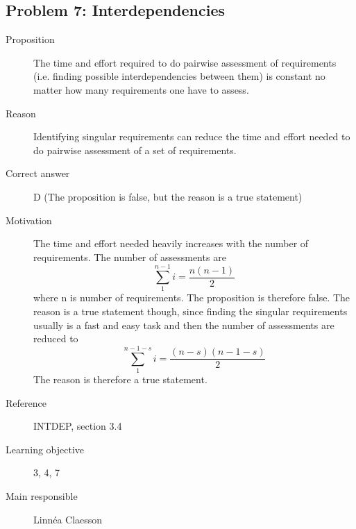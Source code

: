 \documentclass[10pt,a4paper]{article}
\begin{document}
\subsection*{Problem 7: Interdependencies}
\begin{description}
\item[Proposition] The time and effort required to do pairwise assessment of requirements (i.e. finding possible interdependencies between them) is constant no matter how many requirements one have to assess. 
\item[Reason] Identifying singular requirements can reduce the time and effort needed to do pairwise assessment of a set of requirements. 
\item[Correct answer] D (The proposition is false, but the reason is a true statement)
\item[Motivation] The time and effort needed heavily increases with the number of requirements. The number of assessments are 
\begin{equation}
\sum_{1}^{n-1}i = \frac{n(n-1)}{2} 
\end{equation}
where n is number of requirements. The proposition is therefore false. The reason is a true statement though, since finding the singular requirements usually is a fast and easy task and then the number of assessments are reduced to
\begin{equation}
\sum_{1}^{n-1-s}i = \frac{(n-s)(n-1-s)}{2} 
\end{equation}
The reason is therefore a true statement.
\item[Reference] INTDEP, section 3.4
\item[Learning objective] 3, 4, 7
\item[Main responsible] Linn\'ea Claesson
\end{description}

\end{document}
